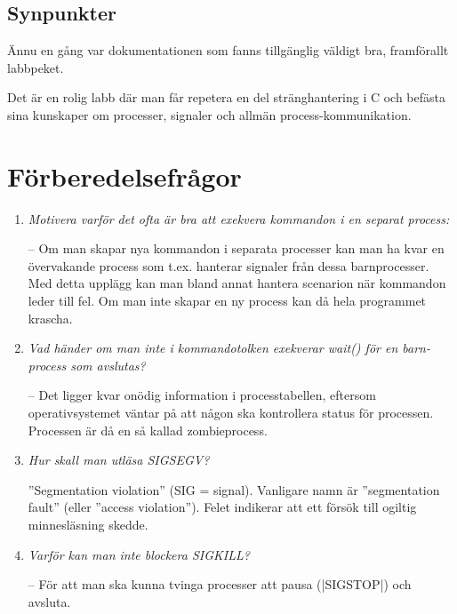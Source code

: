 \documentclass[paper=a4, fontsize=11pt]{scrartcl} %
\numberwithin{equation}{section} %
\numberwithin{figure}{section} %
\numberwithin{table}{section} %
\begin{document}
\subsection{Synpunkter}
Ännu en gång var dokumentationen som fanns tillgänglig väldigt bra, framförallt labbpeket.

Det är en rolig labb där man får repetera en del stränghantering i C 
och befästa sina kunskaper om processer, signaler och allmän process-kommunikation.


\section{Förberedelsefrågor}
\begin{enumerate}[1)]

\item 
\emph{Motivera varför det ofta är bra att exekvera kommandon i en separat process:}

-- Om man skapar nya kommandon i separata processer kan man ha kvar en 
övervakande process som t.ex. hanterar signaler från dessa barnprocesser. 
Med detta upplägg kan man bland annat hantera scenarion när kommandon 
leder till fel. Om man inte skapar en ny process kan då hela programmet krascha.

\item
\emph{Vad händer om man inte i kommandotolken exekverar wait() för en 
barn-process som avslutas?}

-- Det ligger kvar onödig information i processtabellen, 
eftersom operativsystemet väntar på att någon ska kontrollera status för processen. 
Processen är då en så kallad zombieprocess.

\item
\emph{Hur skall man utläsa SIGSEGV?}

''Segmentation violation'' (SIG = signal). 
Vanligare namn är ''segmentation fault'' (eller ''access violation'').
Felet indikerar att ett försök till ogiltig minnesläsning skedde.

\item
\emph{Varför kan man inte blockera SIGKILL?} %

-- För att man ska kunna tvinga processer att pausa (|SIGSTOP|) och avsluta.



\end{enumerate}
\end{document}
